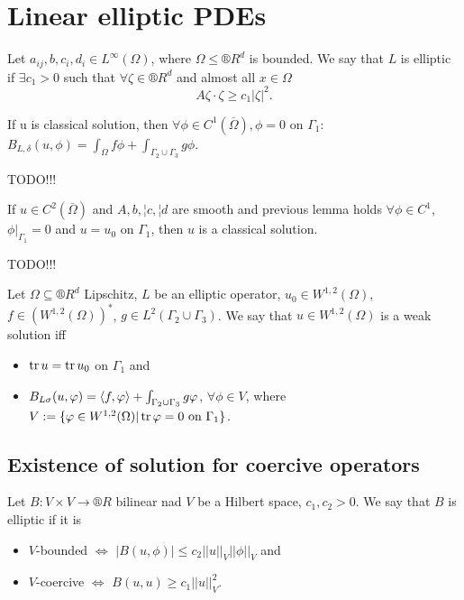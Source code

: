 \documentclass[12pt]{article}					%
\begin{document}
\section{Linear elliptic PDEs}
\begin{definice}[Elliptic]
	Let $a_{ij}, b, c_i, d_i \in L^∞(\Omega)$, where $\Omega ≤ ®R^d$ is bounded. We say that $L$ is elliptic if $\exists c_1 > 0$ such that $\forall \zeta \in ®R^d$ and almost all $x \in \Omega$
	$$ A \zeta · \zeta ≥ c_1 |\zeta|^2. $$
\end{definice}

\begin{lemma}
	If u is classical solution, then $\forall \phi \in C^1(\overline{\Omega}), \phi = 0$ on $\Gamma_1$: $B_{L, \delta}(u, \phi) = \int_\Omega f \phi + \int_{\Gamma_2 \cup \Gamma_3} g \phi$.

	\begin{dukazin}
		TODO!!!
	\end{dukazin}
\end{lemma}

\begin{lemma}
	If $u \in C^2(\overline{\Omega})$ and $A, b, ¦c, ¦d$ are smooth and previous lemma holds $\forall \phi \in C^1$, $\phi|_{\Gamma_1} = 0$ and $u = u_0$ on $\Gamma_1$, then $u$ is a classical solution.

	\begin{dukazin}
		TODO!!!
	\end{dukazin}
\end{lemma}

\begin{definice}
	Let $\Omega \subseteq ®R^d$ Lipschitz, $L$ be an elliptic operator, $u_0 \in W^{1, 2}(\Omega)$, $f \in (W^{1, 2}(\Omega))^*$, $g \in L^2(\Gamma_2 \cup \Gamma_3)$. We say that $u \in W^{1, 2}(\Omega)$ is a weak solution iff
	\begin{itemize}
		\item $\operatorname{tr} u = \operatorname{tr} u_0$ on $\Gamma_1$ and
		\item $B_{L \sigma}(u, \varphi) = \left\langle f, \varphi\right\rangle + \int_{\Gamma_2 \cup \Gamma_3} g \varphi$, $\forall \phi \in V$, where $V := \{\varphi \in W^{1, 2}(\Omega) | \operatorname{tr} \varphi = 0 \text{ on } \Gamma_1\}$.
	\end{itemize}
	
\end{definice}

\subsection{Existence of solution for coercive operators}
\begin{definice}
	Let $B: V \times V \rightarrow ®R$ bilinear nad $V$ be a Hilbert space, $c_1, c_2 > 0$. We say that $B$ is elliptic if it is
	\begin{itemize}
		\item $V$-bounded $\Leftrightarrow$ $|B(u, \phi)| ≤ c_2 ||u||_V ||\phi||_V$ and
		\item $V$-coercive $\Leftrightarrow$ $B(u, u) ≥ c_1 ||u||_V^2$.
	\end{itemize}
\end{definice}
\end{document}
